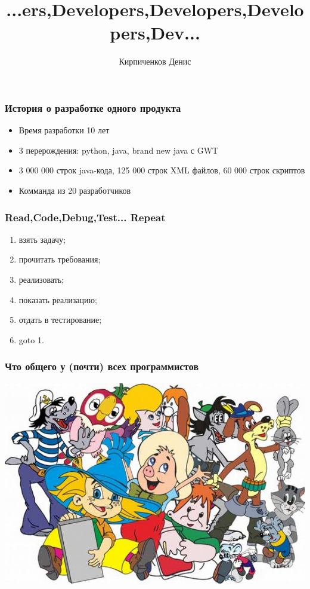 \documentclass[10pt,pdf,hyperref={unicode}]{beamer}
\date{}
\title[]{...ers,Developers,Developers,Developers,Dev...}
\author[]{Кирпиченков Денис}
\institute[]{Naumen}
\begin{document}
\begin{frame}
\titlepage
\end{frame} 

\begin{frame}
\frametitle{История о разработке одного продукта} 

\begin{itemize}
\item Время разработки 10 лет
\item 3 перерождения: python, java, brand new java с GWT
\item 3 000 000 строк java-кода, 125 000 строк XML файлов,  60 000 строк скриптов
\item Комманда из 20 разработчиков
\end{itemize}

\end{frame}

\begin{frame}
\frametitle{Read,Code,Debug,Test... Repeat} 

\begin{enumerate}

	\item взять задачу;
	\item прочитать требования;
	\item реализовать;
	\item показать реализацию;
	\item отдать в тестирование;
	\item goto 1.
	
\end{enumerate}

\end{frame}

\begin{frame}
\frametitle{Что общего у (почти) всех программистов} 

\center
\includegraphics[height=0.6\textheight]{./multi_fun.png}

\end{frame}
\end{document}
